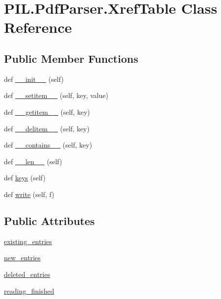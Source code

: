 \hypertarget{classPIL_1_1PdfParser_1_1XrefTable}{}\section{P\+I\+L.\+Pdf\+Parser.\+Xref\+Table Class Reference}
\label{classPIL_1_1PdfParser_1_1XrefTable}
\subsection*{Public Member Functions}
\begin{DoxyCompactItemize}
\item 
def \hyperlink{classPIL_1_1PdfParser_1_1XrefTable_a1223139af52e015e7bb98ac4e83df2ef}{\+\_\+\+\_\+init\+\_\+\+\_\+} (self)
\item 
def \hyperlink{classPIL_1_1PdfParser_1_1XrefTable_a5206b166fb258e341c630f7066e83c40}{\+\_\+\+\_\+setitem\+\_\+\+\_\+} (self, key, value)
\item 
def \hyperlink{classPIL_1_1PdfParser_1_1XrefTable_ab625fe39be35af855e68d1a0cfdf9e2d}{\+\_\+\+\_\+getitem\+\_\+\+\_\+} (self, key)
\item 
def \hyperlink{classPIL_1_1PdfParser_1_1XrefTable_aff0c9c7e385a3a2d481a1f7c6c96ddd5}{\+\_\+\+\_\+delitem\+\_\+\+\_\+} (self, key)
\item 
def \hyperlink{classPIL_1_1PdfParser_1_1XrefTable_a1f8a87f2a8c0485ec0051bc818cb0a1a}{\+\_\+\+\_\+contains\+\_\+\+\_\+} (self, key)
\item 
def \hyperlink{classPIL_1_1PdfParser_1_1XrefTable_a47d3fb068be6bb477d96d1fff239fbce}{\+\_\+\+\_\+len\+\_\+\+\_\+} (self)
\item 
def \hyperlink{classPIL_1_1PdfParser_1_1XrefTable_ae46c660eca4cd706d7aa7427a4b9815a}{keys} (self)
\item 
def \hyperlink{classPIL_1_1PdfParser_1_1XrefTable_a5e6539be085c3ad1341e0412bf83a4cc}{write} (self, f)
\end{DoxyCompactItemize}
\subsection*{Public Attributes}
\begin{DoxyCompactItemize}
\item 
\hyperlink{classPIL_1_1PdfParser_1_1XrefTable_adbc07a4e98abf2bf2118f4b48005eec0}{existing\+\_\+entries}
\item 
\hyperlink{classPIL_1_1PdfParser_1_1XrefTable_afd8decb35ab8b175f8d73f7cfa4e7feb}{new\+\_\+entries}
\item 
\hyperlink{classPIL_1_1PdfParser_1_1XrefTable_abad9064e6c831bf85499db856e0b3100}{deleted\+\_\+entries}
\item 
\hyperlink{classPIL_1_1PdfParser_1_1XrefTable_adf3456a503c93899eb12c75e68b97ba6}{reading\+\_\+finished}
\end{DoxyCompactItemize}


